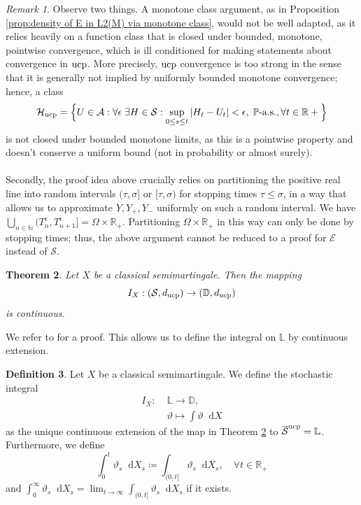 \documentclass[11pt,a4paper,twoside,openany]{report}
\numberwithin{equation}{section}
\newcommand{\diff}{\mathop{}\!\mathrm{d}}
\theoremstyle{plain} %
\newtheorem{theorem}{Theorem}[section]
\theoremstyle{definition} %
\newtheorem{definition}[theorem]{Definition}
\theoremstyle{remark} %
\newtheorem{remark}[theorem]{Remark}
\let\parencite\authnumparencite
\begin{document}
\begin{remark}
Observe two things. A monotone class argument, as in Proposition \ref{prop:density of E in L2(M) via monotone class}, would not be well adapted, as it relies heavily on a function class that is closed under bounded, monotone, pointwise convergence, which is ill conditioned for making statements about convergence in \(\rm{ucp}\). More precisely, \(\rm{ucp}\) convergence is too strong in the sense that it is generally not implied by uniformly bounded monotone convergence; hence, a class \begin{equation*}
    \mathcal{H}_{\rm{ucp}}=\Big\{ U \in \mathcal{A}:\forall \epsilon\;\exists H\in\mathcal{S}:\sup_{0\leq s\leq t}|H_t-U_t|<\epsilon,\; \mathbb{P}\text{-a.s.}, \forall t\in\mathbb{R}+\Big\}
\end{equation*} 
is not closed under bounded monotone limits, as this is a pointwise property and doesn't conserve a uniform bound (not in probability or almost surely). \\\\
Secondly, the proof idea above crucially relies on partitioning the positive real line into random intervals \((\tau,\sigma]\) or \([\tau,\sigma)\) for stopping times \(\tau\leq\sigma\), in a way that allows us to approximate \(Y,Y_+,Y_-\) uniformly on such a random interval. We have \(\bigcup_{n\in\mathbb{N}} (T_n^{\epsilon},T_{n+1}^{\epsilon}]=\Omega\times\mathbb{R}_+\). Partitioning \(\Omega\times\mathbb{R}_+\) in this way can only be done by stopping times; thus, the above argument cannot be reduced to a proof for \(\mathcal{E}\) instead of \(\mathcal{S}\).
\end{remark}
\begin{theorem}\label{thm:UCP continuity of general stochastic integral}
    Let \(X\) be a classical semimartingale. Then the mapping 
    \begin{equation*}
        I_X:(\mathcal{S},d_{\rm{ucp}})\to(\mathbb{D},d_{\rm{ucp}}) 
    \end{equation*}
    is continuous. 
\end{theorem}
We refer to \parencite[Thm.~11,Ch.II]{Protter2005StochasticIntegration} for a proof.
This allows us to define the integral on \(\mathbb{L}\) by continuous extension.
\begin{definition}\label{def:stochastic integral w.r.t. semimartingales}
    Let \(X\) be a classical semimartingale. We define the stochastic integral
    \begin{align*}
        I_X:\;&\mathbb{L}\to\mathbb{D},\\
        &\vartheta\mapsto\int \vartheta\diff X
    \end{align*}
    as the unique continuous extension of the map in Theorem \ref{thm:UCP continuity of general stochastic integral} to \(\overline{\mathcal{S}}^{\rm{ucp}}=\mathbb{L}\). Furthermore, we define
    \begin{equation*}
        \int_0^t\vartheta_s\diff X_s\coloneqq \int_{(0,t]}\vartheta_s\diff X_s,\quad\forall t\in\mathbb{R}_+
    \end{equation*}
    and \(\int_0^\infty\vartheta_s\diff X_s=\lim_{t\to\infty}\int_{(0,t]}\vartheta_s\diff X_s\) if it exists.
\end{definition}
\end{document}
